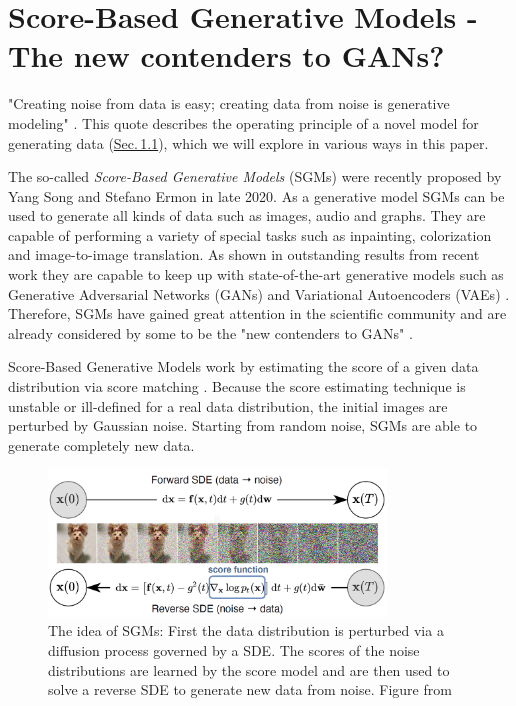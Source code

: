 \section{Score-Based Generative Models - The new contenders to GANs?} 
\thispagestyle{plain}
"Creating noise from data is easy; creating data from noise is generative modeling" \cite{score_3}. This quote describes the operating principle of a novel model for generating data (\hyperref[sec:1.1]{Sec.\,1.1}), which we will explore in various ways in this paper.

The so-called \textit{Score-Based Generative Models} (SGMs) were recently proposed by Yang Song and Stefano Ermon \cite{score_1} in late 2020. As a generative model SGMs can be used to generate all kinds of data such as images, audio and graphs. They are capable of performing a variety of special tasks such as inpainting, colorization and image-to-image translation. As shown in outstanding results from recent work \cite{score_3} they are capable to keep up with state-of-the-art generative models such as Generative Adversarial Networks (GANs) \cite{gan_original} and Variational Autoencoders (VAEs) \cite{vae_original}. Therefore, SGMs have gained great attention in the scientific community and are already considered by some to be the "new contenders to GANs" \cite{blog}.

\thispagestyle{plain}
Score-Based Generative Models work by estimating the score of a given data distribution via score matching \cite{score_matching_original}. Because the score estimating technique is unstable or ill-defined for a real data distribution, the initial images are perturbed by Gaussian noise. Starting from random noise, SGMs are able to generate completely new data.

\thispagestyle{plain}
%
\begin{figure}[]
    \centering
    \includegraphics[width=0.8\textwidth]{Chapters/figures/sgm.PNG}
    \caption[The idea of Score-Based Generative Models]{The idea of SGMs: First the data distribution is perturbed via a diffusion process governed by a SDE. The scores of the noise distributions are learned by the score model and are then used to solve a reverse SDE to generate new data from noise. Figure from \cite{score_3}}
\end{figure}
%


